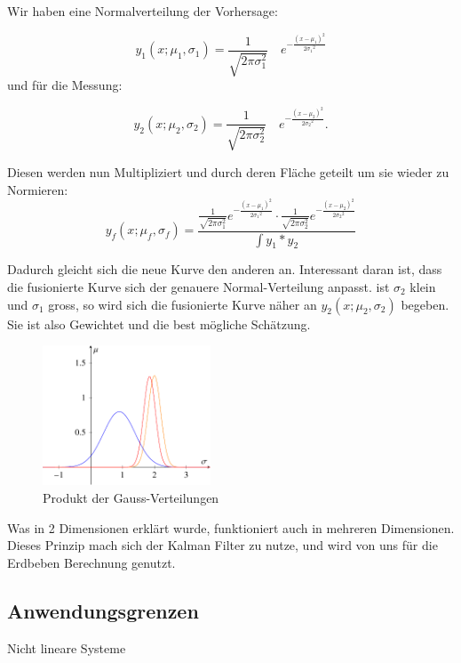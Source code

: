 \documentclass[11pt,a4paper]{article}
\begin{document}
Wir haben eine Normalverteilung der Vorhersage:

\begin{equation}
{y_1}(x;{\mu_1},{\sigma_1})=\frac{1}{\sqrt{2\pi\sigma_1^2}}\quad e^{-\frac{(x-{\mu_1})^2}{2{\sigma_1}^2}}
\end{equation} 
und für die Messung:

\begin{equation}
{y_2}(x;{\mu_2},{\sigma_2})=\frac{1}{\sqrt{2\pi\sigma_2^2}}\quad e^{-\frac{(x-{\mu_2})^2}{2{\sigma_2}^2}}.
\end{equation} 

Diesen werden nun Multipliziert und durch deren Fläche geteilt um sie wieder zu Normieren:
\begin{equation}
{y_f}(x;{\mu_f},{\sigma_f})=\frac{ \frac{1}{\sqrt{2\pi\sigma_1^2}}e^{-\frac{(x-{\mu_1})^2}{2{\sigma_1}^2}} \cdot \frac{1}{\sqrt{2\pi\sigma_2^2}}e^{-\frac{(x-{\mu_2})^2}{2{\sigma_2}^2}}}{\int {y_1}*{y_2}\,}
\end{equation} 

Dadurch gleicht sich die neue Kurve den anderen an. Interessant daran ist, dass die fusionierte Kurve sich der genauere Normal-Verteilung anpasst. ist ${\sigma_2}$ klein und ${\sigma_1}$ gross, so wird sich die fusionierte Kurve näher an ${y_2}(x;{\mu_2},{\sigma_2})$ begeben. Sie ist also Gewichtet und die best mögliche Schätzung. 

 \begin{figure}[h]
 \begin{center}
 \includegraphics[width=5cm]{Gausskurve3}
 \caption{Produkt der Gauss-Verteilungen}
 \end{center}
\end{figure}
Was in 2 Dimensionen erklärt wurde, funktioniert auch in mehreren Dimensionen. Dieses Prinzip mach sich der Kalman Filter zu nutze, und wird von uns für die Erdbeben Berechnung genutzt. 

\subsection{Anwendungsgrenzen}
Nicht lineare Systeme %
\end{document}
